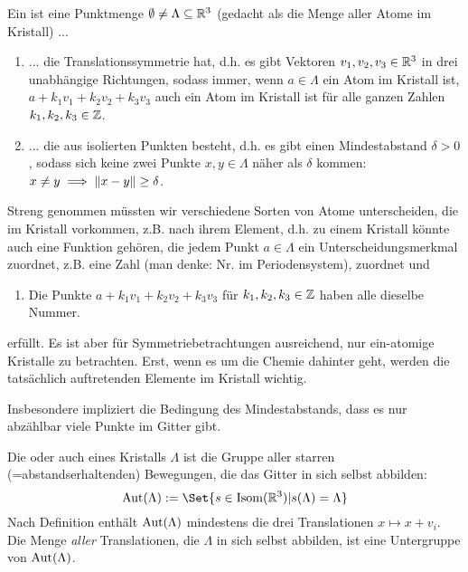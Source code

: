 
\begin{definition}[Kristalle]
Ein  ist eine Punktmenge $\emptyset\neq\Lambda\subseteq\mathbb{R}^3$ (gedacht als die Menge aller Atome im Kristall) ...
\begin{enumerate}
\item ... die Translationssymmetrie hat, d.h. es gibt Vektoren $v_1,v_2,v_3\in\mathbb{R}^3$ in drei unabhängige Richtungen, sodass immer, wenn $a\in\Lambda$ ein Atom im Kristall ist, $a+k_1v_1+k_2v_2+k_3v_3$ auch ein Atom im Kristall ist für alle ganzen Zahlen $k_1,k_2,k_3\in\mathbb{Z}$.
\item ... die aus isolierten Punkten besteht, d.h. es gibt einen Mindestabstand $\delta>0$, sodass sich keine zwei Punkte $x,y\in\Lambda$ näher als $\delta$ kommen: $x\neq y \implies\lVert x-y\rVert\geq\delta$.
\end{enumerate}
Streng genommen müssten wir verschiedene Sorten von Atome unterscheiden, die im Kristall vorkommen, z.B. nach ihrem Element, d.h. zu einem Kristall könnte auch eine Funktion gehören, die jedem Punkt $a\in\Lambda$ ein Unterscheidungsmerkmal zuordnet, z.B. eine Zahl (man denke: Nr. im Periodensystem), zuordnet und
\begin{enumerate}[resume]
\item Die Punkte $a+k_1v_1+k_2v_2+k_3v_3$ für $k_1,k_2,k_3\in\mathbb{Z}$ haben alle dieselbe Nummer.
\end{enumerate}
erfüllt. Es ist aber für Symmetriebetrachtungen ausreichend, nur ein-atomige Kristalle zu betrachten. Erst, wenn es um die Chemie dahinter geht, werden die tatsächlich auftretenden Elemente im Kristall wichtig.
\end{definition}

\begin{remark}
Insbesondere impliziert die Bedingung des Mindestabstands, dass es nur abzählbar viele Punkte im Gitter gibt.
\end{remark}

\begin{definition}
Die  oder auch  eines Kristalls $\Lambda$ ist die Gruppe aller starren (=abstandserhaltenden) Bewegungen, die das Gitter in sich selbst abbilden:
\[\Aut(\Lambda) := \Set{s\in \operatorname{Isom}(\IR^3) | s(\Lambda)=\Lambda}\]
Nach Definition enthält $\operatorname{Aut}(\Lambda)$ mindestens die drei Translationen $x\mapsto x+v_i$. Die Menge \emph{aller} Translationen, die $\Lambda$ in sich selbst abbilden, ist eine Untergruppe von $\operatorname{Aut}(\Lambda)$.
\end{definition}


